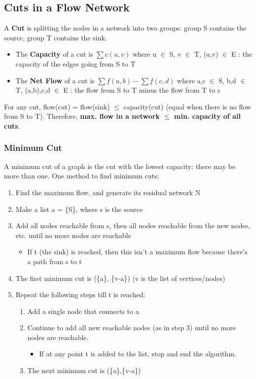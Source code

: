 \subsection{Cuts in a Flow Network}
A \textbf{Cut} is splitting the nodes in a network into two groups: group S contains the source, group T contains the sink. 
\begin{itemize}
    \item The \textbf{Capacity} of a cut is $\sum c(u,v)$ where u $\in$ S, v $\in$ T, (u,v) $\in$ E : the capacity of the edges going from S to T
    \item The \textbf{Net Flow} of a cut is $\sum f(a,b) - \sum f(c,d)$ where a,c $\in$ S, b,d $\in$ T, (a,b),c,d $\in$ E : the flow from S to T minus the flow from T to s
\end{itemize}
For any cut, flow(cut) = flow(sink) $\leq$ capacity(cut) (equal when there is no flow from S to T). Therefore, \textbf{max. flow in a network $\boldsymbol{\leq}$ min. capacity of all cuts}.

\subsubsection{Minimum Cut}
A minimum cut of a graph is the cut with the lowest capacity: there may be more than one. One method to find minimum cuts:
\begin{enumerate}
    \item Find the maximum flow, and generate its residual network N
    \item Make a list a = \{S\}, where s is the source 
    \item Add all nodes reachable from s, then all nodes reachable from the new nodes, etc. until no more nodes are reachable
    \begin{itemize}
        \item If t (the sink) is reached, then this isn't a maximum flow because there's a path from s to t
    \end{itemize}
    \item The first minimum cut is (\{a\}, \{v-a\}) (v is the list of vertices/nodes)
    \item Repeat the following steps till t is reached:
    \begin{enumerate}
        \item Add a single node that connects to a
        \item Continue to add all new reachable nodes (as in step 3) until no more nodes are reachable.
        \begin{itemize}
            \item If at any point t is added to the list, stop and end the algorithm.
        \end{itemize}
        \item The next minimum cut is (\{a\},\{v-a\})
    \end{enumerate}
\end{enumerate}

